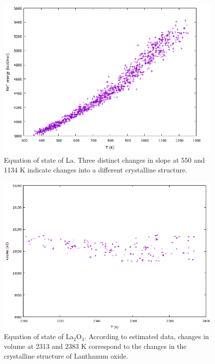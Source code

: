 \documentclass[journal=jpcafh,manuscript=article]{achemso}
\begin{document}
\pagebreak

\begin{figure}[hbtp]
\centering
\includegraphics[scale=0.75]{Paper/images/La-nvt-EvsT.png}
\caption{Equation of state of La. Three distinct changes in slope at 550 and 1134 K indicate changes into a different crystalline structure.}
\label{fig:la-nvt-EvsT}
\end{figure}

\pagebreak

\begin{figure}[hbtp]
\centering
\includegraphics[scale=0.75]{Paper/images/La2O3-VvsT.png}
\caption{Equation of state of La$_2$O$_3$. According to estimated data, changes in volume at 2313 and 2383 K correspond to the changes in the crystalline structure of Lanthanum oxide.}
\label{fig:la2O3-npt-VvsT}
\end{figure}
\end{document}
